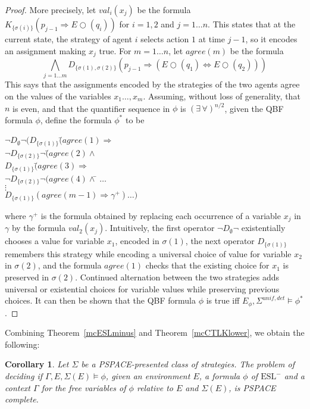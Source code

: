 \documentclass[a4wide]{article}
\newcommand{\ESL}{\mbox{ESL}}
\newcommand{\dimp}{\Leftrightarrow}
\newtheorem{cor}{Corollary}
\theoremstyle{examplesty}
\newcommand{\strat}{\sigma}
\newcommand{\rimp}{\Rightarrow}
\newcommand{\Env}{E}
\newcommand{\nxt}{\Circle}
\newcommand{\detstrat}{\mathit{det}}
\newcommand{\unif}{\mathit{unif}}
\newcommand{\Strat}{\Sigma}
\newcommand{\Cont}{\Gamma}
\begin{document}
\begin{proof}
More precisely, let $val_i(x_j)$ be the formula 
$K_{\{\strat(i)\}}(p_{j-1} \rimp 
E\nxt
(q_i))$ for $i=1,2$ and $j = 1\ldots n$. 
This states that at the current state, the strategy of agent
$i$ selects action $1$ at time $j-1$, so it encodes an assignment making $x_j$ true. 
For $m = 1\ldots n$, let $agree(m)$ be the formula 
$$ \bigwedge_{j=1\ldots m} D_{\{\strat(1), \strat(2)\}}(p_{j-1} \rimp (
E\nxt
(q_1) \dimp 
E\nxt 
(q_2))) $$
This says that the assignments encoded by the strategies of the two agents agree on the values
of the variables $x_1 \ldots, x_m$.  
Assuming, without loss of generality, that $n$ is even, 
and that the quantifier sequence in $\phi$ is $(\exists\, \forall)^{n/2}$, 
given the QBF formula $\phi$, 
define the formula $\phi^*$ to be 
\begin{tabbing} 
$\neg D_\emptyset\neg ( D_{\{\strat(1)\}}($\=$agree(1) \rimp$ \\ 
\> $\neg D_{\{\strat(2)\}}\neg ($\=$agree(2) \land$  \\ 
\>\>$D_{\{\strat(1)\}}($\=$agree(3) \rimp$ \\ 
\>\> \> $\neg D_{\{\strat(2)\}}\neg ( agree(4)\land $\= $ \ldots  $ \\ 
\>\>\> \> $\vdots$ \\
\>\>\>\> $D_{\{\strat(1)\}}( agree(m-1) \rimp \gamma^{+})\ldots )$
\end{tabbing}
where $\gamma^+$ is the formula obtained by replacing each 
occurrence of a variable $x_j$ in $\gamma$ by the formula $val_2(x_j)$. 
Intuitively, the first operator $\neg D_\emptyset\neg  $
existentially chooses a value for variable $x_1$, encoded in $\strat(1)$, the
next operator 
$D_{\{\strat(1)\}}$ 
remembers this strategy while
encoding a universal choice of value for variable $x_2$ in $\strat(2)$, and
the formula $agree(1)$ checks that the existing choice for $x_1$ 
is preserved in $\strat(2)$. Continued alternation between the
two strategies adds universal or existential choices 
for variable values while preserving previous choices. 
It can then be shown that the QBF formula $\phi$ is true 
iff $\Env_\phi, \Strat^{\unif, \detstrat}\models \phi^*$. 
\end{proof} 

Combining Theorem~\ref{mcESLminus} and Theorem~\ref{mcCTLKlower}, we obtain the following: 

\begin{cor} 
Let $\Strat$ be a PSPACE-presented class of strategies. 
The problem of deciding if $\Cont, \Env, \Strat(\Env) \models \phi$,  
given an environment $\Env$, a formula $\phi$ of $\ESL^-$
and a context $\Cont$ for the free variables of $\phi$ relative to $\Env$ and $\Strat(\Env)$, 
is PSPACE complete. 
\end{cor} 
\end{document}
